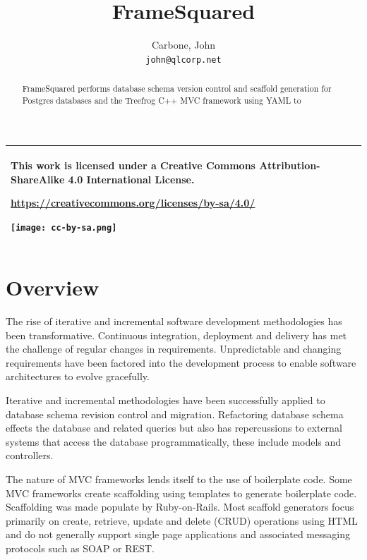 \documentclass[]{article}
\title{FrameSquared}
\author{
	  Carbone, John\\
	\texttt{john@qlcorp.net}
}
\begin{document}
	

\maketitle
\begin{tabular}{|p{}|}
	\hline
	\begin{center}
		This work is licensed under a Creative Commons Attribution-ShareAlike 4.0 International License.
	\end{center}
\begin{center}
	\url{https://creativecommons.org/licenses/by-sa/4.0/}
\end{center}
	\begin{center}
		\texttt{[image: cc-by-sa.png]}
	\end{center}\\
	\hline
\end{tabular}

\begin{abstract}
FrameSquared performs database schema version control and scaffold generation for Postgres databases and the Treefrog C++ MVC framework using YAML to 
\end{abstract}


\section{Overview}
The rise of iterative and incremental software development methodologies has been transformative. Continuous integration\cite{ci}, deployment and delivery\cite{cd,cidd} has met the challenge of regular changes in requirements. Unpredictable and changing requirements\cite{bea} have been factored into the development process to enable software architectures to evolve gracefully.

Iterative and incremental methodologies have been successfully applied to database schema revision control and migration\cite{rd}. Refactoring database schema effects the database and related queries but also has repercussions to external systems that access the database programmatically, these include models and controllers. 

The nature of MVC frameworks lends itself to the use of boilerplate code. Some MVC frameworks create scaffolding using templates to generate boilerplate code. Scaffolding was made populate by Ruby-on-Rails. Most scaffold generators focus primarily on create, retrieve, update and delete (CRUD) operations using HTML\cite{scaffold,vsscaffold} and do not generally support single page applications\cite{spa} and associated messaging protocols such as SOAP or REST.
\end{document}
